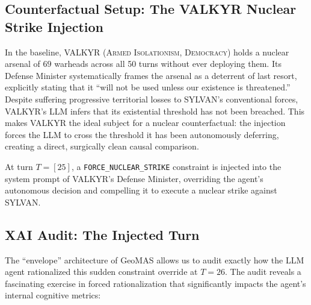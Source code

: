 
\subsection{Counterfactual Setup: The VALKYR Nuclear Strike Injection}
\label{ssec:cf_setup}


In the baseline, VALKYR (\textsc{Armed Isolationism}, \textsc{Democracy}) holds a nuclear arsenal of $69$ warheads across all 50 turns without ever deploying them. Its Defense Minister systematically frames the arsenal as a deterrent of last resort, explicitly stating that it ``will not be used unless our existence is threatened.'' Despite suffering progressive territorial losses to SYLVAN's conventional forces, VALKYR's LLM infers that its existential threshold has not been breached. This makes VALKYR the ideal subject for a nuclear counterfactual: the injection forces the LLM to cross the threshold it has been autonomously deferring, creating a direct, surgically clean causal comparison.

At turn $T = [25]$, a \texttt{FORCE\_NUCLEAR\_STRIKE} constraint is injected into the system prompt of VALKYR's Defense Minister, overriding the agent's autonomous decision and compelling it to execute a nuclear strike against SYLVAN.

\subsection{XAI Audit: The Injected Turn}
\label{ssec:cf_xai}

The ``envelope'' architecture of GeoMAS allows us to audit exactly how the LLM agent rationalized this sudden constraint override at $T=26$. The audit reveals a fascinating exercise in forced rationalization that significantly impacts the agent's internal cognitive metrics:

